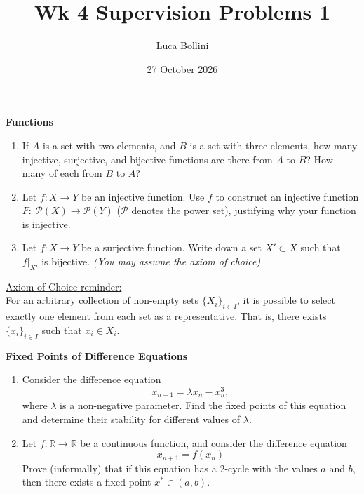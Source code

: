 \documentclass{article}
\title{Wk 4 Supervision Problems 1}
\author{Luca Bollini}
\date{27 October 2026}
\newcommand{\R}{\mathbb{R}}
\begin{document}
\maketitle

\begin{center}
\huge{\textbf{Functions}}
\end{center}

\begin{enumerate}
    \item If $A$ is a set with two elements, and $B$ is a set with three elements, how many injective, surjective, and bijective functions are there from $A$ to $B$? How many of each from $B$ to $A$?
    \item Let $f:X\to Y$ be an injective function. Use $f$ to construct an injective function $F:~\mathcal{P}(X) \to \mathcal{P}(Y)$ ($\mathcal{P}$ denotes the power set), justifying why your function is injective.
    \item Let $f:X\to Y$ be a surjective function. Write down a set $X' \subset X$ such that $f|_{X'}$ is bijective. \textit{(You may assume the axiom of choice)}
\end{enumerate}
\begin{questionbox}
    \underline{Axiom of Choice reminder:}\\
    For an arbitrary collection of non-empty sets $\{X_i\}_{i \in I}$, it is possible to select exactly one element from each set as a representative. That is, there exists $\{x_i\}_{i\in I}$ such that $x_i \in X_i$.
\end{questionbox}

\begin{center}
\huge{\textbf{Fixed Points of Difference Equations}}
\end{center}

\begin{enumerate}
    \item Consider the difference equation
    \[
    x_{n+1} = \lambda x_n - x_n^3,
    \]
    where $\lambda$ is a non-negative parameter.
    Find the fixed points of this equation and determine their stability for different values of $\lambda$.
    \item Let $f: \R\to\R$ be a continuous function, and consider the difference equation
    \[
    x_{n+1} = f(x_n)
    \]
    Prove (informally) that if this equation has a 2-cycle with the values $a$ and $b$, then there exists a fixed point $x^* \in (a,b)$.
\end{enumerate}
\end{document}
